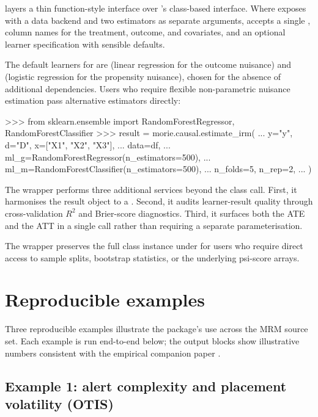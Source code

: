 \documentclass[article,shortnames,nojss]{jss}
\newcommand{\OTIS}{\textsf{OTIS}}
\begin{document}
 layers a thin function-style interface over
's class-based interface. Where 
exposes  with a data
backend and two  estimators as separate
arguments,  accepts a single
 , column names for the treatment,
outcome, and covariates, and an optional learner specification
with sensible defaults.

The default learners for  are
 (linear regression for the outcome
nuisance) and  (logistic regression
for the propensity nuisance), chosen for the absence of
additional dependencies. Users who require flexible non-parametric
nuisance estimation pass alternative  estimators
directly:

\begin{Code}
>>> from sklearn.ensemble import RandomForestRegressor, RandomForestClassifier
>>> result = morie.causal.estimate_irm(
...     y="y", d="D", x=["X1", "X2", "X3"],
...     data=df,
...     ml_g=RandomForestRegressor(n_estimators=500),
...     ml_m=RandomForestClassifier(n_estimators=500),
...     n_folds=5, n_rep=2,
... )
\end{Code}

\noindent The wrapper performs three additional services beyond
the  class call. First, it harmonises the result
object to a . Second, it audits learner-result
quality through cross-validation $R^{2}$ and Brier-score
diagnostics. Third, it surfaces both the ATE and the ATT in a
single call rather than requiring a separate 
parameterisation.

The wrapper preserves the full  class instance under
 for users who require direct access to
sample splits, bootstrap statistics, or the underlying psi-score
arrays.

\section{Reproducible examples}
\label{sec:examples}

Three reproducible examples illustrate the package's use across
the MRM source set.  Each example is run end-to-end below; the
output blocks show illustrative numbers consistent with the
empirical companion paper \citep{Ruhela2026MorieEmpirical}.

\subsection[Example 1: alert complexity and placement volatility (OTIS)]{Example 1: alert complexity and placement volatility (\OTIS{})}
\end{document}

